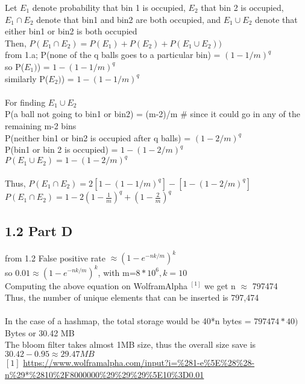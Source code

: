 \documentclass[12pt]{article}
\begin{document}
Let \(E_1\) denote probability that bin 1 is occupied, \(E_2\) that bin 2 is occupied, \(E_1 \cap E_2\) denote that bin1 and bin2 are both occupied, and \(E_1 \cup E_2\) denote that either bin1 or bin2 is both occupied \\
Then, \(P(E_1 \cap E_2)=P(E_1)+P(E_2)+P(E_1 \cup E_2))\) \\
from 1.a; P(none of the q balls goes to a particular bin) = \((1-1/m)^{q}\) \\
so P(\(E_1)\)) = \(1-(1-1/m)^{q}\) \\
similarly P(\(E_2)\)) = \(1-(1-1/m)^{q}\) \\
\\
For finding \(E_1 \cup E_2\) \\
P(a ball not going to bin1 or bin2) = (m-2)/m \# since it could go in any of the remaining m-2 bins \\ 
P(neither bin1 or bin2 is occupied after q balls) = \((1-2/m)^q\) \\
P(bin1 or bin 2 is occupied) = \(1-(1-2/m)^q\) \\
\(P(E_1 \cup E_2) = 1-(1-2/m)^q\) \\~\\
Thus, \(P(E_1 \cap E_2)=2[1-(1-1/m)^{q}] - [1-(1-2/m)^q] \) \\ 
\(P(E_1 \cap E_2)= 1 - 2(1-\frac{1}{m})^q + (1-\frac{2}{m})^q\) \\

\subsection*{1.2 Part D} 
\vspace{10pt}

from 1.2 False positive rate \( \approx  (1-e^{-nk/m})^k\) \\
so \(0.01 \approx (1-e^{-nk/m})^k\), with m=\(8*10^6, k=10\) \\
Computing the above equation on WolframAlpha \(^{[1]}\) we get n \(\approx\) 797474 \\
Thus, the number of unique elements that can be inserted is 797,474 \\~\\
In the case of a hashmap, the total storage would be 40*n bytes = \(797474*40)\) Bytes or 30.42 MB \\
The bloom filter takes almost 1MB size, thus the overall size save is \(30.42-0.95 \approx 29.47 MB\)
\\
\([1]\) \url{https://www.wolframalpha.com/input?i=%281-e%5E%28%28-n%29*%2810%2F8000000%29%29%29%5E10%3D0.01}
\end{document}
